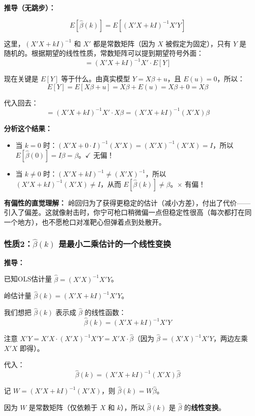 \documentclass[12pt,a4paper]{ctexart}
\begin{document}
\textbf{推导（无跳步）：}

\[
E[\hat{\beta}(k)] = E[(X'X + kI)^{-1}X'Y]
\]

这里，$(X'X + kI)^{-1}$ 和 $X'$ 都是常数矩阵（因为 $X$ 被假定为固定），只有 $Y$ 是随机的。根据期望的线性性质，常数矩阵可以提到期望符号外面：
\[
= (X'X + kI)^{-1}X' \cdot E[Y]
\]

现在关键是 $E[Y]$ 等于什么。由真实模型 $Y = X\beta + u$，且 $E(u) = 0$，所以：
\[
E[Y] = E[X\beta + u] = X\beta + E(u) = X\beta + 0 = X\beta
\]

代入回去：
\[
= (X'X + kI)^{-1}X' \cdot X\beta = (X'X + kI)^{-1}(X'X)\beta \tag{4.29}
\]

\textbf{分析这个结果：}
\begin{itemize}
\item 当 $k = 0$ 时：$(X'X + 0 \cdot I)^{-1}(X'X) = (X'X)^{-1}(X'X) = I$，所以 $E[\hat{\beta}(0)] = I\beta = \beta$。$\checkmark$ 无偏！
\item 当 $k \neq 0$ 时：$(X'X + kI)^{-1} \neq (X'X)^{-1}$，所以 $(X'X + kI)^{-1}(X'X) \neq I$，从而 $E[\hat{\beta}(k)] \neq \beta$。$\times$ 有偏！
\end{itemize}

\textbf{有偏性的直觉理解：} 岭回归为了获得更稳定的估计（减小方差），付出了代价——引入了偏差。这就像射击时，你宁可枪口稍微偏一点但稳定性很高（每次都打在同一个地方），也不愿枪口对准靶心但弹着点到处散开。

\subsubsection{性质2：$\hat{\beta}(k)$ 是最小二乘估计的一个线性变换}

\textbf{推导：}

已知OLS估计量 $\hat{\beta} = (X'X)^{-1}X'Y$。

岭估计量 $\hat{\beta}(k) = (X'X + kI)^{-1}X'Y$。

我们想把 $\hat{\beta}(k)$ 表示成 $\hat{\beta}$ 的线性函数：
\[
\hat{\beta}(k) = (X'X + kI)^{-1}X'Y
\]

注意 $X'Y = X'X \cdot (X'X)^{-1}X'Y = X'X \cdot \hat{\beta}$（因为 $\hat{\beta} = (X'X)^{-1}X'Y$，两边左乘 $X'X$ 即得）。

代入：
\[
\hat{\beta}(k) = (X'X + kI)^{-1}(X'X)\hat{\beta}
\]

记 $W = (X'X + kI)^{-1}(X'X)$，则 $\hat{\beta}(k) = W\hat{\beta}$。

因为 $W$ 是常数矩阵（仅依赖于 $X$ 和 $k$），所以 $\hat{\beta}(k)$ 是 $\hat{\beta}$ 的\textbf{线性变换}。
\end{document}

